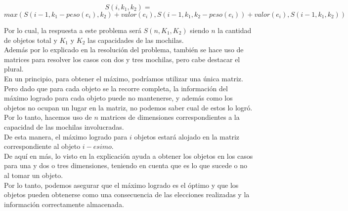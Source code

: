 \begin{equation}
S(i, k_1, k_2) = 
\end{equation}
\begin{equation}
max(S(i-1, k_1-peso(e_i), k_2)+valor(e_i), 
        S(i-1, k_1, k_2-peso(e_i))+valor(e_i), 
        S(i-1, k_1, k_2))
\end{equation}

Por lo cual, la respuesta a este problema será $S(n, K_1, K_2)$ siendo $n$ la cantidad de objetos total y $K_1$ y $K_2$ las capacidades de las mochilas.\\

Además por lo explicado en la resolución del problema, tambi\'en se hace uso de matrices para resolver los casos con dos y tres mochilas, pero cabe destacar el plural. \\

En un principio, para obtener el máximo, podr\'iamos utilizar una única matriz. Pero dado que para cada objeto se la recorre completa, la información del máximo logrado para cada objeto puede no mantenerse, y además como los objetos no ocupan un lugar en la matriz, no podemos saber cual de estos lo logró.\\
Por lo tanto, hacemos uso de $n$ matrices de dimensiones correspondientes a la capacidad de las mochilas involucradas. \\

De esta manera, el máximo logrado para $i$ objetos estará alojado en la matriz correspondiente al objeto $i-esimo$.\\

De aquí en más, lo visto en la explicación ayuda a obtener los objetos en los casos para una y dos o tres dimensiones, teniendo en cuenta que es lo que sucede o no al tomar un objeto. \\

Por lo tanto,  podemos asegurar que el máximo logrado es el \'optimo y que los objetos pueden obtenerse como una consecuencia de las elecciones realizadas y la información correctamente almacenada.
